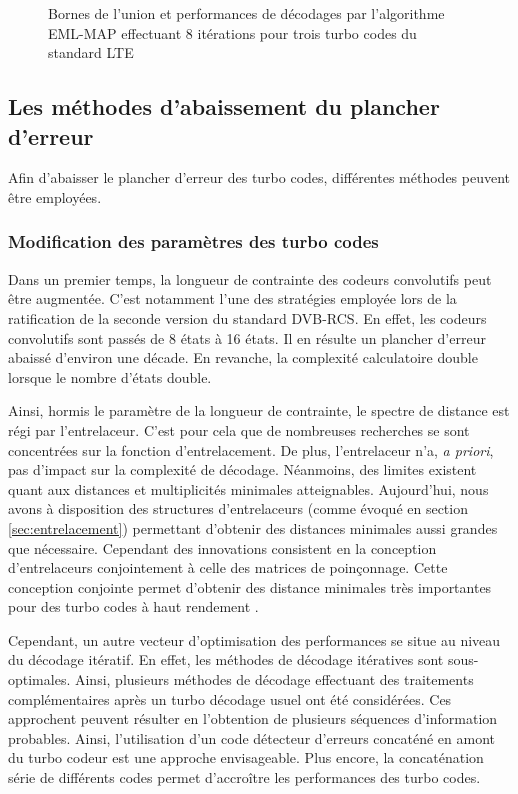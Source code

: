 
\begin{figure}[h!]
	\centering
	
	\label{fig:ubound}
	\caption{Bornes de l'union et performances de décodages par l'algorithme EML-MAP effectuant 8 itérations pour trois 
	turbo codes du standard LTE}
\end{figure}
		
\subsection{Les méthodes d'abaissement du plancher d'erreur}
Afin d'abaisser le plancher d'erreur des turbo codes, différentes méthodes peuvent être employées. 
\subsubsection{Modification des paramètres des turbo codes}
Dans un premier temps, la longueur de contrainte des codeurs convolutifs peut être augmentée. C'est notamment l'une des 
stratégies employée lors de la ratification de la seconde version du standard DVB-RCS. En effet, les codeurs convolutifs 
sont passés de 8 états à 16 états. Il en résulte un plancher d'erreur abaissé d'environ une décade. En revanche, la 
complexité calculatoire double lorsque le nombre d'états double.
		
Ainsi, hormis le paramètre de la longueur de contrainte, le spectre de distance est régi par l'entrelaceur. C'est pour 
cela que de nombreuses recherches se sont concentrées sur la fonction d'entrelacement. De plus, l'entrelaceur n'a, 
\textit{a priori}, pas d'impact sur la complexité de décodage. Néanmoins, des limites existent quant aux distances et 
multiplicités minimales atteignables. Aujourd'hui, nous avons à disposition des structures d'entrelaceurs (comme évoqué 
en section \ref{sec:entrelacement}) permettant d'obtenir des distances minimales aussi grandes que nécessaire. Cependant 
des innovations consistent en la conception d'entrelaceurs conjointement à celle des matrices de poinçonnage. Cette 
conception conjointe permet d'obtenir des distance minimales très importantes pour des turbo codes à haut rendement 
\cite{punctureConstrained}.

Cependant, un autre vecteur d'optimisation des performances se situe au niveau du décodage itératif. En effet, les 
méthodes de décodage itératives sont sous-optimales. Ainsi, plusieurs méthodes de décodage effectuant des traitements 
complémentaires après un turbo décodage usuel ont été considérées. Ces approchent peuvent résulter en l'obtention de 
plusieurs séquences d'information probables. Ainsi, l'utilisation d'un code détecteur d'erreurs concaténé en amont du 
turbo codeur est une approche envisageable. Plus encore, la concaténation série de différents codes permet d’accroître 
les performances des turbo codes. 

